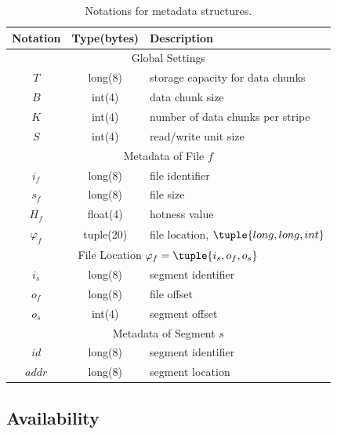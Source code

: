 \begin{table}[t]
    \centering 
    \small
    \begin{tabular}{|c|c|l|} 
        \hline
        {\bf Notation}  & {\bf Type(bytes)} & {\bf Description}\\ 
        \hline 
        \multicolumn{3}{|c|}{Global Settings} \\
        \hline 
        $T$ & long(8)  & storage capacity for data chunks\\
        $B$ & int(4) & data chunk size \\
        $K$ & int(4) & number of data chunks per stripe\\
        $S$  & int(4) & read/write unit size\\
        \hline 
        \multicolumn{3}{|c|}{Metadata of File $f$} \\
        \hline
        $i_{f}$ & long(8) & file identifier\\
        $s_{f}$ & long(8) & file size  \\
        $H_{f}$ & float(4) & hotness value \\
        $\varphi_{f}$ & tuple(20) & file location, $\tuple{long,long,int}$ \\ 
        \hline 
        \multicolumn{3}{|c|}{File Location $\varphi_{f} = \tuple{i_{s},o_{f},o_{s}}$} \\
        \hline 
        $i_{s}$ & long(8) & segment identifier\\
        $o_{f}$ & long(8)& file offset \\
        $o_{s}$  & int(4)& segment offset\\
        \hline
        \multicolumn{3}{|c|}{Metadata of Segment $s$} \\
        \hline
        $id$ & long(8) & segment identifier\\
        $addr$  & long(8) & segment location\\
        \hline
    \end{tabular}
    \caption{Notations for metadata structures.}
    \label{tab:notation} 
\end{table}


\subsection{Availability}
\label{subsec:availability}

